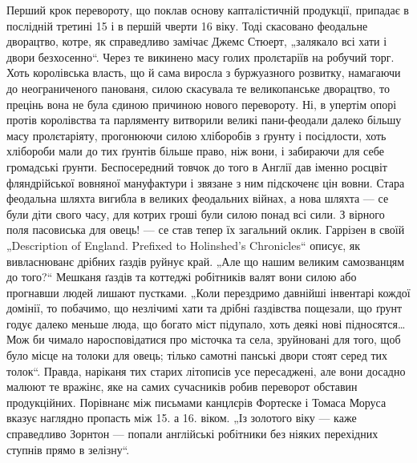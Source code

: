 
Перший крок перевороту, що поклав основу капталістичній продукції, припадає в послідній третині 15 і
в першій чверти 16 віку. Тоді скасовано феодальне дворацтво, котре, як справедливо замічає Джемс
Стюерт, „залякало  всі хати і двори безхосенно“. Через те викинено масу голих пролєтаріїв на
робучий торг. Хоть королівська власть, що й сама виросла з буржуазного розвитку, намагаючи до
неограниченого панованя, силою скасувала те великопанське дворацтво, то прецінь вона не була єдиною
причиною нового перевороту. Ні, в упертім опорі протів королівства та
парляменту витворили великі пани-феодали далеко більшу масу пролєтаріяту, прогонюючи силою
хліборобів з ґрунту і посідлости, хоть хлібороби мали до тих ґрунтів більше право, ніж вони, і
забираючи для себе громадські ґрунти. Беспосередний товчок до того в Англії дав іменно росцвіт
фляндрійської вовняної мануфактури і звязане з ним підскоченє цін вовни. Стара феодальна шляхта
вигибла в великих феодальних війнах, а нова шляхта — се були діти свого часу, для котрих гроші були
силою понад всі сили. З вірного поля пасовиська для овець! — се став тепер їх загальний оклик.
Гаррізен в своїй „Description of England. Prefixed to Holinshed’s Chronicles“ описує, як
вивласнюванє дрібних ґаздів руйнує край. „Але що нашим великим самозванцям до того?“ Мешканя ґаздів
та коттеджі робітників валят вони силою або прогнавши людей лишают пустками. „Коли перездримо
давнійші інвентарі кождої домінії, то побачимо, що незлічимі хати та дрібні ґаздівства пощезали, що
ґрунт годує далеко меньше люда, що богато міст підупало, хоть деякі нові підносятся\dots{} Мож би
чимало наросповідатися про місточка та села, зруйновані для того, щоб було місце на толоки для
овець; тілько самотні панські двори стоят серед тих толок“. Правда, наріканя тих старих літописів
усе пересаджені, але вони досадно малюют те вражінє, яке на самих сучасників робив переворот
обставин продукційних. Порівнанє між письмами канцлєрів Фортеске і Томаса Моруса вказує наглядно
пропасть між 15. а 16. віком. „Із золотого віку — каже справедливо Зорнтон — попали англійські
робітники без ніяких перехідних ступнів прямо в зелізну“.

